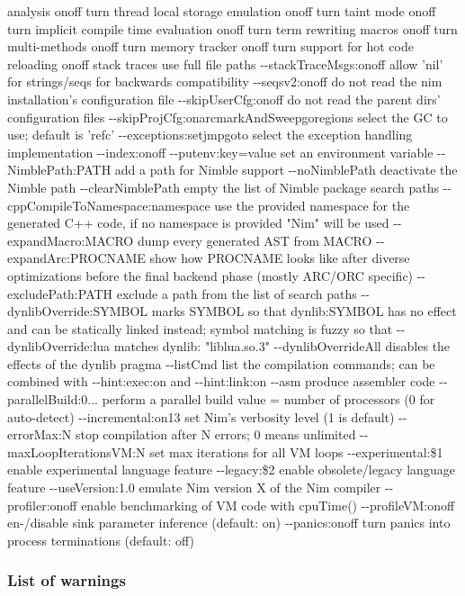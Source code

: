 \begin{description}
analysis onoff turn thread local storage emulation onoff turn taint mode
onoff turn implicit compile time evaluation onoff turn term rewriting
macros onoff turn multi-methods onoff turn memory tracker onoff turn
support for hot code reloading onoff stack traces use full file paths
-\/-stackTraceMsgs:onoff allow 'nil' for strings/seqs for backwards
compatibility -\/-seqsv2:onoff do not read the nim installation's
configuration file -\/-skipUserCfg:onoff do not read the parent dirs'
configuration files -\/-skipProjCfg:onarcmarkAndSweepgoregions select
the GC to use; default is 'refc' -\/-exceptions:setjmpgoto select the
exception handling implementation -\/-index:onoff -\/-putenv:key=value
set an environment variable -\/-NimblePath:PATH add a path for Nimble
support -\/-noNimblePath deactivate the Nimble path -\/-clearNimblePath
empty the list of Nimble package search paths
-\/-cppCompileToNamespace:namespace use the provided namespace for the
generated C++ code, if no namespace is provided "Nim" will be used
-\/-expandMacro:MACRO dump every generated AST from MACRO
-\/-expandArc:PROCNAME show how PROCNAME looks like after diverse
optimizations before the final backend phase (mostly ARC/ORC specific)
-\/-excludePath:PATH exclude a path from the list of search paths
-\/-dynlibOverride:SYMBOL marks SYMBOL so that dynlib:SYMBOL has no
effect and can be statically linked instead; symbol matching is fuzzy so
that -\/-dynlibOverride:lua matches dynlib: "liblua.so.3"
-\/-dynlibOverrideAll disables the effects of the dynlib pragma
-\/-listCmd list the compilation commands; can be combined with
{-\/-hint:exec:on} and {-\/-hint:link:on} -\/-asm produce assembler code
-\/-parallelBuild:0... perform a parallel build value = number of
processors (0 for auto-detect) -\/-incremental:on13 set Nim's verbosity
level (1 is default) -\/-errorMax:N stop compilation after N errors; 0
means unlimited -\/-maxLoopIterationsVM:N set max iterations for all VM
loops -\/-experimental:\$1 enable experimental language feature
-\/-legacy:\$2 enable obsolete/legacy language feature
-\/-useVersion:1.0 emulate Nim version X of the Nim compiler
-\/-profiler:onoff enable benchmarking of VM code with cpuTime()
-\/-profileVM:onoff en-/disable sink parameter inference (default: on)
-\/-panics:on\textbar off turn panics into process terminations
(default: off)
\end{description}

\hypertarget{list-of-warnings}{%
\subsubsection{List of warnings}\label{list-of-warnings}}

